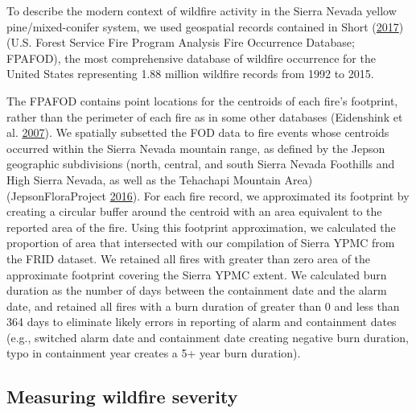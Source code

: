 \documentclass[twoside,12pt,final]{ucthesis-CA2012}
\begin{document}
\begin{ucmainmatter}
To describe the modern context of wildfire activity in the Sierra Nevada
yellow pine/mixed-conifer system, we used geospatial records contained
in Short (\protect\hyperlink{ref-short2017}{2017}) (U.S. Forest Service
Fire Program Analysis Fire Occurrence Database; FPAFOD), the most
comprehensive database of wildfire occurrence for the United States
representing 1.88 million wildfire records from 1992 to 2015.

The FPAFOD contains point locations for the centroids of each fire's
footprint, rather than the perimeter of each fire as in some other
databases (Eidenshink et al.
\protect\hyperlink{ref-eidenshink2007}{2007}). We spatially subsetted
the FOD data to fire events whose centroids occurred within the Sierra
Nevada mountain range, as defined by the Jepson geographic subdivisions
(north, central, and south Sierra Nevada Foothills and High Sierra
Nevada, as well as the Tehachapi Mountain Area) (JepsonFloraProject
\protect\hyperlink{ref-jepsonfloraproject2016}{2016}). For each fire
record, we approximated its footprint by creating a circular buffer
around the centroid with an area equivalent to the reported area of the
fire. Using this footprint approximation, we calculated the proportion
of area that intersected with our compilation of Sierra YPMC from the
FRID dataset. We retained all fires with greater than zero area of the
approximate footprint covering the Sierra YPMC extent. We calculated
burn duration as the number of days between the containment date and the
alarm date, and retained all fires with a burn duration of greater than
0 and less than 364 days to eliminate likely errors in reporting of
alarm and containment dates (e.g., switched alarm date and containment
date creating negative burn duration, typo in containment year creates a
5+ year burn duration).

\subsection{Measuring wildfire
severity}\label{measuring-wildfire-severity}


\end{ucmainmatter}
\end{document}
